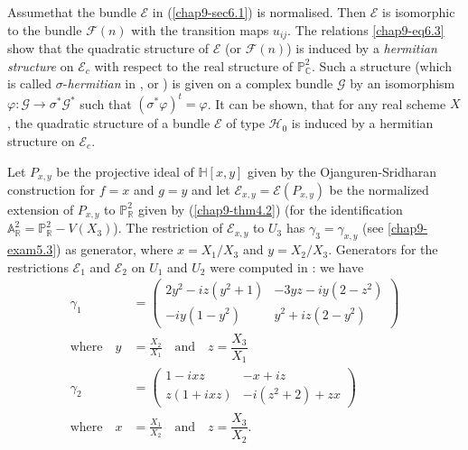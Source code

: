 \setcounter{subprop}{3}
\begin{subremark}\label{chap9-rem6.4}
Assume\pageoriginale that the bundle $\mathscr{E}$ in
(\ref{chap9-sec6.1}) is normalised. Then $\mathscr{E}$ is isomorphic
to the bundle $\mathscr{F}(n)$ with the transition maps $u_{ij}$. The
relations \eqref{chap9-eq6.3} show that the quadratic structure of
$\mathscr{E}$ (or $\mathscr{F}(n)$) is induced by a {\em hermitian
structure} on $\mathscr{E}_{c}$ with respect to the real structure of
$\mathbb{P}^{2}_{\mathbb{C}}$. Such a structure (which is called
$\sigma$-{\em hermitian} in \cite{chap9-key6}, \cite{chap9-key7}
or \cite{chap9-key10}) is given on a complex bundle $\mathscr{G}$ by
an isomorphism $\varphi:\mathscr{G}\to \sigma^{*}\mathscr{G}^{*}$ such
that $(\sigma^{*}\varphi)^{t}=\varphi$. It can be shown, that for any
real scheme $X$, the quadratic structure of a bundle $\mathscr{E}$ of
type $\mathscr{H}_{0}$ is induced by a hermitian structure on
$\mathscr{E}_{c}$. 
\end{subremark}

\begin{subexam}\label{chap9-exam6.5}
Let $P_{x,y}$ be the projective ideal of $\mathbb{H}[x,y]$ given by
the Ojanguren-Sridharan construction for $f=x$ and $g=y$ and let
$\mathscr{E}_{x,y}=\mathscr{E}(P_{x,y})$ be the normalized extension
of $P_{x,y}$ to $\mathbb{P}^{2}_{\mathbb{R}}$ given by
(\ref{chap9-thm4.2}) (for the identification
$\mathbb{A}^{2}_{\mathbb{R}}=\mathbb{P}^{2}_{\mathbb{R}}-V(X_{3})$). The
restriction of $\mathscr{E}_{x,y}$ to $U_{3}$ has
$\gamma_{3}=\gamma_{x,y}$ (see \ref{chap9-exam5.3}) as generator,
where $x=X_{1}/X_{3}$ and $y=X_{2}/X_{3}$. Generators for the
restrictions $\mathscr{E}_{1}$ and $\mathscr{E}_{2}$ on $U_{1}$ and
$U_{2}$ were computed in \cite{chap9-key4}: we have
\begin{align*}
\gamma_{1} &=
\begin{pmatrix}
2y^{2}-iz(y^{2}+1) & -3yz-iy(2-z^{2})\\
-iy(1-y^{2}) & y^{2}+iz(2-y^{2})
\end{pmatrix}\\
\text{where}\quad y &= \frac{X_{2}}{X_{1}}\quad\text{and}\quad
z=\dfrac{X_{3}}{X_{1}}\\
\gamma_{2} &= 
\begin{pmatrix}
1-ixz & -x+iz\\
z(1+ixz) & -i(z^{2}+2)+zx
\end{pmatrix}\\
\text{where}\quad x &= \frac{X_{1}}{X_{2}}\quad\text{and}\quad
z=\dfrac{X_{3}}{X_{2}}. 
\end{align*}
\end{subexam}

